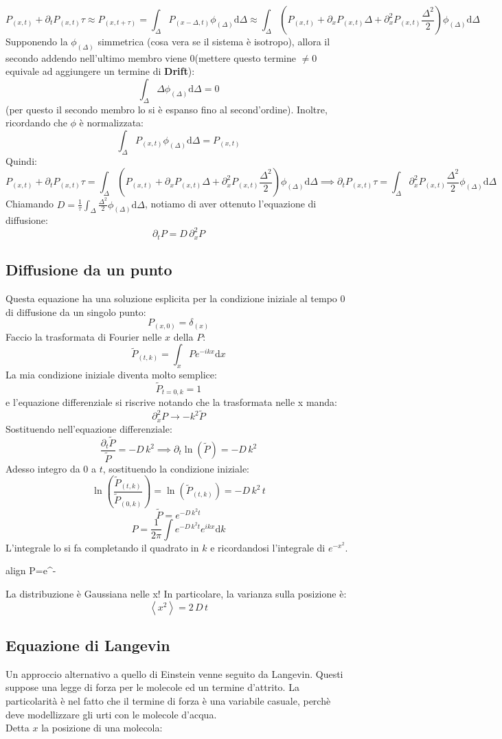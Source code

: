 \documentclass[a4paper,12pt]{article}
\renewcommand{\arg}[1]{_{(#1)}}
\newcommand{\boxedeq}[2]{\begin{empheq}[box={\fboxsep=6pt\fbox}]{align}\label{#1}#2\end{empheq}}
\theoremstyle{plain}
\theoremstyle{definition}
\newcommand{\f}[2]{\frac{#1}{#2}}
\newcommand{\ave}[1]{\left\langle#1\right\rangle }
\newcommand{\tdv}{\partial_t}
\renewcommand{\d}{\text{d}}
\theoremstyle{remark}
\begin{document}
	\[P\arg{x,t}+\partial_tP\arg{x,t} \tau \approx P\arg{x,t+\tau} = \int_\Delta P\arg{x-\Delta,t}  \phi\arg{\Delta} \d \Delta\approx  \int_\Delta (P\arg{x,t}+\partial_x P\arg{x,t} \Delta+\partial_x^2 P\arg{x,t}\f{ \Delta^2}{2} ) \phi\arg{\Delta} \d \Delta\]
	Supponendo la $\phi\arg{\Delta}$ simmetrica (cosa vera se il sistema è isotropo), allora il secondo addendo nell'ultimo membro viene 0(mettere questo termine $\ne0$ equivale ad aggiungere un termine di \textbf{Drift}):
	\[\int_\Delta \Delta \phi\arg{\Delta}\d\Delta=0		\]
	(per questo il secondo membro lo si è espanso fino al second'ordine).
	Inoltre, ricordando che $\phi$ è normalizzata:
	\[ \int_\Delta P\arg{x,t} \phi\arg{\Delta} \d \Delta=P\arg{x,t}\]
	Quindi:
	\[P\arg{x,t}+\partial_tP\arg{x,t} \tau= \int_\Delta (P\arg{x,t}+\partial_x P\arg{x,t} \Delta+\partial_x^2 P\arg{x,t}\f{ \Delta^2}{2} ) \phi\arg{\Delta} \d \Delta\implies \partial_tP\arg{x,t} \tau=\int_\Delta\partial_x^2 P\arg{x,t}\f{ \Delta^2}{2}  \phi\arg{\Delta} \d \Delta\]
	Chiamando $D=\f{1}{\tau}\int_\Delta\f{ \Delta^2}{2}  \phi\arg{\Delta} \d \Delta$, notiamo di aver ottenuto l'equazione di diffusione:
	\[\tdv P=D \,\partial_x^2 P	\]
	\subsection{Diffusione da un punto}
	Questa equazione ha una soluzione esplicita per la condizione iniziale al tempo 0 di diffusione da un singolo punto:
	\[P\arg{x,0}=\delta\arg{x}		\]
	Faccio la trasformata di Fourier nelle $x$ della $P$:
	\[\tilde{P}\arg{t,k}=\int_x P e^{-ikx}	\d x	\]
	La mia condizione iniziale diventa molto semplice:
	\[\tilde{P}_{t=0,k}=1\]
	e l'equazione differenziale si riscrive notando che la trasformata nelle x manda:
	\[\partial_x^2 P\rightarrow -k^2 \tilde{P}		\]
	Sostituendo nell'equazione differenziale:
	\[\f{\tdv \tilde{P}}{\tilde{P}}=-D\,k^2\implies \tdv \ln(\tilde{P})=-D\,k^2		\]
	Adesso integro da $0$ a $t$, sostituendo la condizione iniziale:
	\[\ln(\frac{\tilde{P}\arg{t,k}}{\tilde{P}\arg{0,k}})=\ln({\tilde{P}\arg{t,k}})=-D\,k^2 \,t\]
\[\tilde{P}=e^{-D\,k^2 t}\]
	\[P=\f{1}{2\pi}\int e^{-D\,k^2 t} e^{ikx} \d k		\]
	L'integrale lo si fa completando il quadrato in $k$ e ricordandosi l'integrale di $e^{-x^2}$.\boxedeq{Diffusion}{
		P=\f{1}{\sqrt{4\pi D t}}e^{-\f{x^2}{4D\,t}}}
	La distribuzione è Gaussiana nelle x!
	In particolare, la varianza sulla posizione è:
	\[\ave{x^2}=2\,D\,t\]
	\subsection{Equazione di Langevin}
	Un approccio alternativo a quello di Einstein venne seguito da Langevin. Questi suppose una legge di forza per le molecole ed un termine d'attrito. La particolarità è nel fatto che il termine di forza è una variabile casuale, perchè deve modellizzare gli urti con le molecole d'acqua.
	\\Detta $x$ la posizione di una molecola:
	
\end{document}
